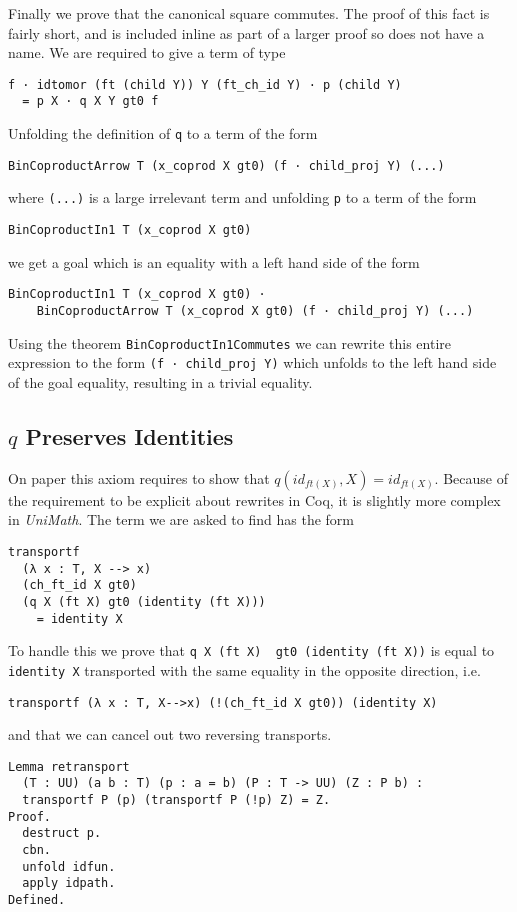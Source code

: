 Finally we prove that the canonical square commutes. The proof of this fact is
fairly short, and is included inline as part of a larger proof so does not have
a name. We are required to give a term of type
\begin{lstlisting}
f · idtomor (ft (child Y)) Y (ft_ch_id Y) · p (child Y) 
  = p X · q X Y gt0 f
\end{lstlisting}
Unfolding the definition of \lstinline|q| to a term of the form
\begin{lstlisting}
BinCoproductArrow T (x_coprod X gt0) (f · child_proj Y) (...)
\end{lstlisting}
where \lstinline|(...)| is a large irrelevant term and unfolding \lstinline|p|
to a term of the form
\begin{lstlisting}
BinCoproductIn1 T (x_coprod X gt0)
\end{lstlisting}
we get a goal which is an equality with a left hand side of the form
\begin{lstlisting}
BinCoproductIn1 T (x_coprod X gt0) · 
    BinCoproductArrow T (x_coprod X gt0) (f · child_proj Y) (...)
\end{lstlisting}
Using the theorem \lstinline|BinCoproductIn1Commutes| we can rewrite this entire
expression to the form \lstinline|(f · child_proj Y)| which unfolds to the left
hand side of the goal equality, resulting in a trivial equality.

\subsection{$q$ Preserves Identities}
On paper this axiom requires to show that $q(id_{ft(X)}, X) = id_{ft(X)}$.
Because of the requirement to be explicit about rewrites in Coq, it is slightly
more complex in \textit{UniMath}. The term we are asked to find has the form
\begin{lstlisting}
transportf 
  (λ x : T, X --> x) 
  (ch_ft_id X gt0) 
  (q X (ft X) gt0 (identity (ft X))) 
    = identity X
\end{lstlisting}

To handle this we prove that \lstinline|q X (ft X)  gt0 (identity (ft X))| is
equal to \lstinline|identity X| transported with the same equality in the
opposite direction, i.e.
\begin{lstlisting}
transportf (λ x : T, X-->x) (!(ch_ft_id X gt0)) (identity X)
\end{lstlisting}
and that we can cancel out two reversing transports.
\begin{lstlisting}
Lemma retransport 
  (T : UU) (a b : T) (p : a = b) (P : T -> UU) (Z : P b) :
  transportf P (p) (transportf P (!p) Z) = Z.
Proof.
  destruct p.
  cbn.
  unfold idfun.
  apply idpath.
Defined.
\end{lstlisting}

